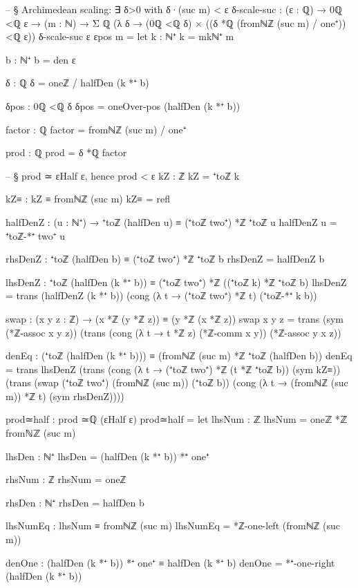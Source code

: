 \documentclass[11pt,a4paper]{book}
\begin{document}
\begin{code}
-- § Archimedean scaling: ∃ δ>0 with δ·(suc m) < ε
δ-scale-suc : (ε : ℚ) → 0ℚ <ℚ ε → (m : ℕ) → Σ ℚ (λ δ → (0ℚ <ℚ δ) × ((δ *ℚ (fromℕℤ (suc m) / one⁺)) <ℚ ε))
δ-scale-suc ε εpos m =
  let
    k : ℕ⁺
    k = mkℕ⁺ m

    b : ℕ⁺
    b = den ε

    δ : ℚ
    δ = oneℤ / halfDen (k *⁺ b)

    δpos : 0ℚ <ℚ δ
    δpos = oneOver-pos (halfDen (k *⁺ b))

    factor : ℚ
    factor = fromℕℤ (suc m) / one⁺

    prod : ℚ
    prod = δ *ℚ factor

    -- § prod ≃ εHalf ε, hence prod < ε
    kZ : ℤ
    kZ = ⁺toℤ k

    kZ≡ : kZ ≡ fromℕℤ (suc m)
    kZ≡ = refl

    halfDenZ : (u : ℕ⁺) → ⁺toℤ (halfDen u) ≡ (⁺toℤ two⁺) *ℤ ⁺toℤ u
    halfDenZ u = ⁺toℤ-*⁺ two⁺ u

    rhsDenZ : ⁺toℤ (halfDen b) ≡ (⁺toℤ two⁺) *ℤ ⁺toℤ b
    rhsDenZ = halfDenZ b

    lhsDenZ : ⁺toℤ (halfDen (k *⁺ b)) ≡ (⁺toℤ two⁺) *ℤ ((⁺toℤ k) *ℤ ⁺toℤ b)
    lhsDenZ =
      trans
        (halfDenZ (k *⁺ b))
        (cong (λ t → (⁺toℤ two⁺) *ℤ t) (⁺toℤ-*⁺ k b))

    swap : (x y z : ℤ) → (x *ℤ (y *ℤ z)) ≡ (y *ℤ (x *ℤ z))
    swap x y z =
      trans
        (sym (*ℤ-assoc x y z))
        (trans
          (cong (λ t → t *ℤ z) (*ℤ-comm x y))
          (*ℤ-assoc y x z))

    denEq : (⁺toℤ (halfDen (k *⁺ b))) ≡ (fromℕℤ (suc m) *ℤ ⁺toℤ (halfDen b))
    denEq =
      trans
        lhsDenZ
        (trans
          (cong (λ t → (⁺toℤ two⁺) *ℤ (t *ℤ ⁺toℤ b)) (sym kZ≡))
          (trans
            (swap (⁺toℤ two⁺) (fromℕℤ (suc m)) (⁺toℤ b))
            (cong (λ t → (fromℕℤ (suc m)) *ℤ t) (sym rhsDenZ))))

    prod≃half : prod ≃ℚ (εHalf ε)
    prod≃half =
      let
        lhsNum : ℤ
        lhsNum = oneℤ *ℤ fromℕℤ (suc m)

        lhsDen : ℕ⁺
        lhsDen = (halfDen (k *⁺ b)) *⁺ one⁺

        rhsNum : ℤ
        rhsNum = oneℤ

        rhsDen : ℕ⁺
        rhsDen = halfDen b

        lhsNumEq : lhsNum ≡ fromℕℤ (suc m)
        lhsNumEq = *ℤ-one-left (fromℕℤ (suc m))

        denOne : (halfDen (k *⁺ b)) *⁺ one⁺ ≡ halfDen (k *⁺ b)
        denOne = *⁺-one-right (halfDen (k *⁺ b))


\end{code}
\end{document}
